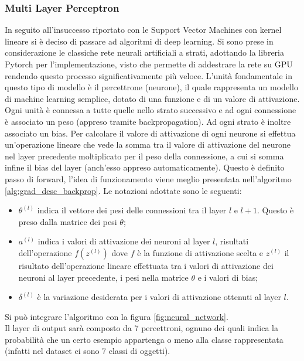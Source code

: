 \subsubsection{Multi Layer Perceptron}
In seguito all'insuccesso riportato con le Support Vector Machines con kernel lineare si è deciso di passare ad algoritmi di deep learning. Si sono prese in considerazione le classiche rete neurali artificiali a strati, adottando la libreria Pytorch per l'implementazione, visto che permette di addestrare la rete su GPU rendendo questo processo significativamente più veloce.
L'unità fondamentale in questo tipo di modello è il percettrone (neurone), il quale rappresenta un modello di machine learning semplice, dotato di una funzione e di un valore di attivazione. Ogni unità è connessa a tutte quelle nello strato successivo e ad ogni connessione è associato un peso (appreso tramite backpropagation). Ad ogni strato è inoltre associato un bias. Per calcolare il valore di attivazione di ogni neurone si effettua un'operazione lineare che vede la somma tra il valore di attivazione del neurone nel layer precedente moltiplicato per il peso della connessione, a cui si somma infine il bias del layer (anch'esso appreso automaticamente). Questo è definito passo di forward, l'idea di funzionamento viene meglio presentata nell'algoritmo \ref{alg:grad_desc_backprop}. Le notazioni adottate sono le seguenti:
\begin{itemize}
    \item $\theta^{(l)}$ indica il vettore dei pesi delle connessioni tra il layer $l$ e $l+1$. Questo è preso dalla matrice dei pesi $\theta$;
    \item $a^{(l)}$ indica i valori di attivazione dei neuroni al layer $l$, risultati dell'operazione $f(z^{(l)})$ dove $f$ è la funzione di attivazione scelta e $z^{(l)}$ il risultato dell'operazione lineare effettuata tra i valori di attivazione dei neuroni al layer precedente, i pesi nella matrice $\theta$ e i valori di bias;
    \item $\delta^{(l)}$ è la variazione desiderata per i valori di attivazione ottenuti al layer $l$.
\end{itemize}
Si può integrare l'algoritmo con la figura \ref{fig:neural_network}.\\
Il layer di output sarà composto da 7 percettroni, ognuno dei quali indica la probabilità che un certo esempio appartenga o meno alla classe rappresentata (infatti nel dataset ci sono 7 classi di oggetti).


